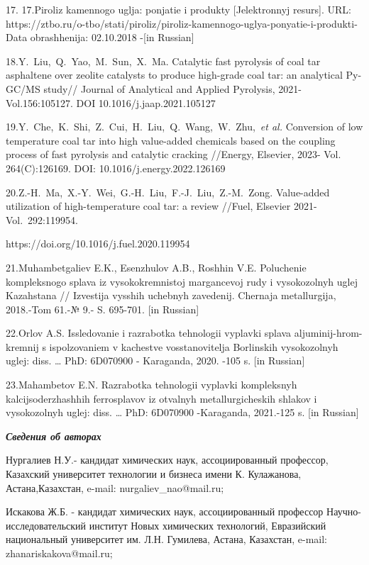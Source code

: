 17. 17.Piroliz kamennogo uglja: ponjatie i produkty {[}Jelektronnyj
resurs{]}. URL:
https://ztbo.ru/o-tbo/stati/piroliz/piroliz-kamennogo-uglya-ponyatie-i-produkti-Data
obrashhenija: 02.10.2018 -{[}in Russian{]}

18.Y.~Liu,~Q.~Yao,~M.~Sun,~X.~Ma. Catalytic fast pyrolysis of coal tar
asphaltene over zeolite catalysts to produce high-grade coal tar: an
analytical Py-GC/MS study// Journal of Analytical and Applied Pyrolysis,
2021-Vol.156:105127. DOI 10.1016/j.jaap.2021.105127

19.Y.~Che,~K.~Shi,~Z.~Cui,~H.~Liu,~Q.~Wang,~W.~Zhu,~\emph{et al.}
Conversion of low temperature coal tar into high value-added chemicals
based on the coupling process of fast pyrolysis and catalytic cracking
//Energy, Elsevier, 2023- Vol. 264(C):126169. DOI:
10.1016/j.energy.2022.126169

20.Z.-H.~Ma,~X.-Y.~Wei,~G.-H.~Liu,~F.-J.~Liu,~Z.-M.~Zong. Value-added
utilization of high-temperature coal tar: a review //Fuel, Elsevier
2021- Vol.~292:119954.

https://doi.org/10.1016/j.fuel.2020.119954

21.Muhambetgaliev E.K., Esenzhulov A.B., Roshhin V.E. Poluchenie
kompleksnogo splava iz vysokokremnistoj margancevoj rudy i
vysokozol\textquotesingle nyh uglej Kazahstana // Izvestija vysshih
uchebnyh zavedenij. Chernaja metallurgija, 2018.-Tom 61.-№ 9.- S.
695-701. {[}in Russian{]}

22.Orlov A.S. Issledovanie i razrabotka tehnologii vyplavki splava
aljuminij-hrom-kremnij s ispol\textquotesingle zovaniem v kachestve
vosstanovitelja Borlinskih vysokozol\textquotesingle nyh uglej: diss.
\ldots{} PhD: 6D070900 - Karaganda, 2020. -105 s. {[}in Russian{]}

23.Mahambetov E.N. Razrabotka tehnologii vyplavki kompleksnyh
kal\textquotesingle cijsoderzhashhih ferrosplavov iz
otval\textquotesingle nyh metallurgicheskih shlakov i
vysokozol\textquotesingle nyh uglej: diss. \ldots{} PhD: 6D070900
-Karaganda, 2021.-125 s. {[}in Russian{]}

\emph{\textbf{Сведения об авторах}}

Нургалиев Н.У.- кандидат химических наук, ассоциированный профессор,
Казахский университет технологии и бизнеса имени К. Кулажанова,
Астана,Казахстан, e-mail: nurgaliev\_nao@mail.ru;

Искакова Ж.Б. - кандидат химических наук, ассоциированный профессор
Научно-исследовательский институт Новых химических технологий,
Евразийский национальный университет им. Л.Н. Гумилева, Астана,
Казахстан, e-mail: zhanariskakova@mail.ru;

